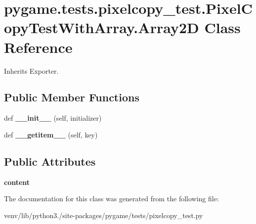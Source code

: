\hypertarget{classpygame_1_1tests_1_1pixelcopy__test_1_1_pixel_copy_test_with_array_1_1_array2_d}{}\section{pygame.\+tests.\+pixelcopy\+\_\+test.\+Pixel\+Copy\+Test\+With\+Array.\+Array2D Class Reference}
\label{classpygame_1_1tests_1_1pixelcopy__test_1_1_pixel_copy_test_with_array_1_1_array2_d}


Inherits Exporter.

\subsection*{Public Member Functions}
\begin{DoxyCompactItemize}
\item 
\mbox{\label{classpygame_1_1tests_1_1pixelcopy__test_1_1_pixel_copy_test_with_array_1_1_array2_d_a9073c69f0f9da52b6c784c79cbef4097}} 
def {\bfseries \+\_\+\+\_\+init\+\_\+\+\_\+} (self, initializer)
\item 
\mbox{\label{classpygame_1_1tests_1_1pixelcopy__test_1_1_pixel_copy_test_with_array_1_1_array2_d_a64f162e8f38332c241a18c0f160df807}} 
def {\bfseries \+\_\+\+\_\+getitem\+\_\+\+\_\+} (self, key)
\end{DoxyCompactItemize}
\subsection*{Public Attributes}
\begin{DoxyCompactItemize}
\item 
\mbox{\label{classpygame_1_1tests_1_1pixelcopy__test_1_1_pixel_copy_test_with_array_1_1_array2_d_ab538d370cb3c9f9f9f7a2a1edc782e1b}} 
{\bfseries content}
\end{DoxyCompactItemize}


The documentation for this class was generated from the following file\+:\begin{DoxyCompactItemize}
\item 
venv/lib/python3./site-\/packages/pygame/tests/pixelcopy\+\_\+test.\+py\end{DoxyCompactItemize}
